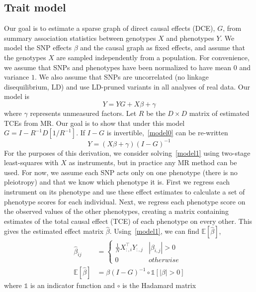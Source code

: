 \documentclass{article}
\begin{document}
\subsection{Trait model}
Our goal is to estimate a sparse graph of direct causal effects (DCE), $G$, from
summary association statistics between genotypes $X$ and phenotypes $Y$. We model
the SNP effects $\beta$ and the causal graph as fixed effects, and assume that the genotypes
$X$ are sampled independently from a population. For convenience, we assume that SNPs
 and phenotypes have been normalized
 to have mean $0$ and variance $1$. We also assume that SNPs are uncorrelated (no linkage disequilibrium, LD)
and use LD-pruned variants in all analyses of real data.
Our model is
\begin{equation}\label{model0}
 Y = Y G + X \beta + \gamma
\end{equation}
where $\gamma$ represents unmeasured factors.
Let $R$ be the $D \times D$ matrix of estimated TCEs from
MR. Our goal is to show that under this model
$G = I - R^{-1} D[1 / R^{-1}]$.
If $I - G$ is invertible,~\eqref{model0} can be re-written
\begin{equation}\label{model1}
Y = (X \beta + \gamma)(I - G)^{-1}
\end{equation}
For the purposes of this derivation, we consider solving~\eqref{model1}
using two-stage least-squares with $X$ as instruments, but in practice any MR method can be used.
For now, we assume each SNP acts only on one phenotype
(there is no pleiotropy) and that we know which phenotype it is.
First we regress each instrument on its phenotype and use these effect
 estimates to calculate a set of phenotype scores for each individual.
Next, we regress each phenotype score on the observed values of the other phenotypes,
 creating a matrix containing estimates of the total causal effect (TCE) of
 each phenotype on every other. This gives the estimated effect matrix $\hat{\beta}$.
Using~\eqref{model1}, we can find $\mathbb{E}[\hat{\beta} ]$,
\begin{align*}
\hat{\beta}_{ij} &= \left\{
 \begin{array}{ll}
  \frac{1}{N} X_{:, i}^{\top}Y_{:,j} & |\beta_{i,j}| > 0 \\
  0 & otherwise
 \end{array} \right. \\
 \mathbb{E}[\hat{\beta} ] &= \beta (I-G)^{-1} \circ \mathds{1}[|\beta| > 0]
\end{align*}
where $\mathds{1}$ is an indicator function and $\circ$ is the Hadamard matrix
\end{document}
